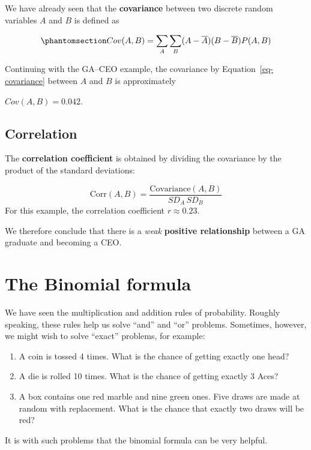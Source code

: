 \documentclass[
  letterpaper,
  DIV=11,
  numbers=noendperiod]{scrreprt}
\providecommand{\tightlist}{%
  \setlength{\itemsep}{0pt}\setlength{\parskip}{0pt}}
\begin{document}
We have already seen that the \textbf{covariance} between two discrete
random variables \(A\) and \(B\) is defined as

\begin{equation}\phantomsection\label{eq-covariance}{
Cov(A,B) = \sum_A \sum_B (A - \overline{A})(B - \overline{B}) P(A,B)
}\end{equation}

Continuing with the GA--CEO example, the covariance by
Equation~\ref{eq-covariance} between \(A\) and \(B\) is approximately

\(Cov(A,B) = 0.042\).

\subsection{Correlation}\label{correlation-1}

The \textbf{correlation coefficient} is obtained by dividing the
covariance by the product of the standard deviations:

\[
\text{Corr}(A,B) = \dfrac{\text{Covariance}(A,B)}{SD_A \, SD_B}
\] For this example, the correlation coefficient \(r \approx 0.23\).

We therefore conclude that there is a \emph{weak} \textbf{positive
relationship} between a GA graduate and becoming a CEO.

\section{The Binomial formula}\label{the-binomial-formula}

We have seen the multiplication and addition rules of probability.
Roughly speaking, these rules help us solve ``and'' and ``or'' problems.
Sometimes, however, we might wish to solve ``exact'' problems, for
example:

\begin{enumerate}
\def\labelenumi{\arabic{enumi}.}
\tightlist
\item
  A coin is tossed 4 times. What is the chance of getting exactly one
  head?
\item
  A die is rolled 10 times. What is the chance of getting exactly 3
  Aces?
\item
  A box contains one red marble and nine green ones. Five draws are made
  at random with replacement. What is the chance that exactly two draws
  will be red?
\end{enumerate}

It is with such problems that the binomial formula can be very helpful.
\end{document}
